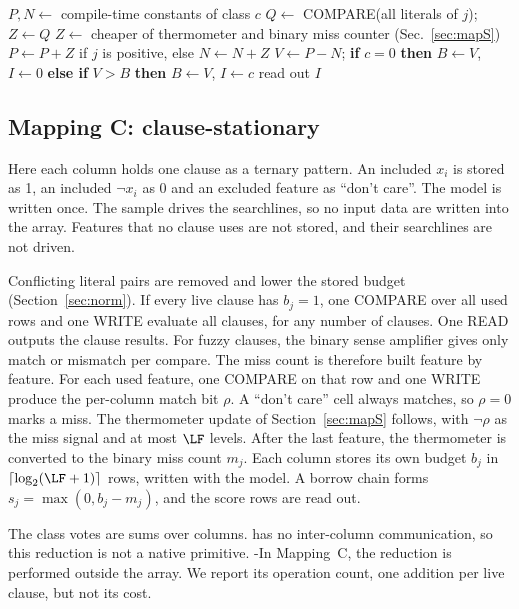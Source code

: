 \begin{algorithm}[t]
\caption{Sample-stationary FPTM program (broadcast to all columns).}
\label{alg:mapS}
\begin{algorithmic}[1]
  \State $P,N \gets$ compile-time constants of class $c$
     \State $Q\gets$ COMPARE(all literals of $j$); $Z\gets Q$
    \Else \State $Z\gets$ cheaper of thermometer and binary miss counter (Sec.~\ref{sec:mapS})
    \EndIf
    \State $P\gets P+Z$ if $j$ is positive, else $N\gets N+Z$
  \EndFor
  \State $V\gets P-N$; \textbf{if} $c=0$ \textbf{then} $B\gets V$, $I\gets0$ \textbf{else if} $V>B$ \textbf{then} $B\gets V$, $I\gets c$
\EndFor
\State read out $I$
\end{algorithmic}
\end{algorithm}

\subsection{Mapping C: clause-stationary}\label{sec:mapC}
Here each column holds one clause as a ternary pattern.
An included $x_i$ is stored as 1, an included $\lnot x_i$ as 0 and an excluded feature as ``don't care''.
The model is written once. The sample drives the searchlines, so no input data are written into the array.
Features that no clause uses are not stored, and their searchlines are not driven.

Conflicting literal pairs are removed and lower the stored budget (Section~\ref{sec:norm}).
If every live clause has $b_j=1$, one COMPARE over all used rows and one WRITE evaluate all clauses, for any number of clauses. One READ outputs the clause results.
For fuzzy clauses, the binary sense amplifier gives only match or mismatch per compare.
The miss count is therefore built feature by feature.
For each used feature, one COMPARE on that row and one WRITE produce the per-column match bit $\rho$.
A ``don't care'' cell always matches, so $\rho=0$ marks a miss.
The thermometer update of Section~\ref{sec:mapS} follows, with $\lnot\rho$ as the miss signal and at most $\LF$ levels.
After the last feature, the thermometer is converted to the binary miss count $m_j$.
Each column stores its own budget $b_j$ in $\lceil\log_2(\LF+1)\rceil$ rows, written with the model.
A borrow chain forms $s_j=\max(0,b_j-m_j)$, and the score rows are read out.

The class votes are sums over columns.
\gainp{} has no inter-column communication, so this reduction is not a native primitive.
\hyp{In Mapping~C, the reduction is performed outside the array. We report its operation count, one addition per live clause, but not its cost.}
